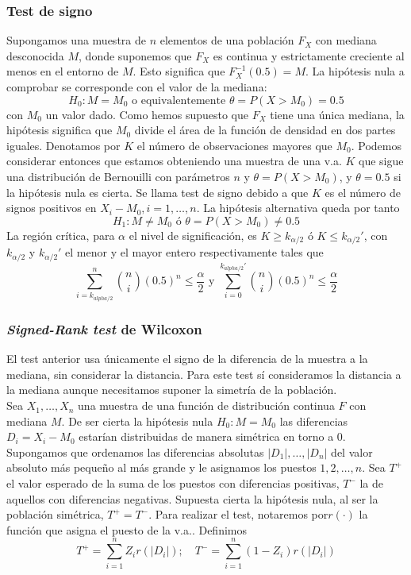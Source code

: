 \subsubsection{Test de signo}

	Supongamos una muestra de $n$ elementos de una población $F_X$ con mediana desconocida $M$, donde suponemos que $F_X$ es continua y estrictamente creciente al menos en el entorno de $M$. Esto significa que $F_X^{-1}(0.5) = M$. La hipótesis nula a comprobar se corresponde con el valor de la mediana:
	\[ H_0: M = M_0	\text{ o equivalentemente }
			\theta = P(X > M_0) = 0.5 \]
	con $M_0$ un valor dado. Como hemos supuesto que $F_X$ tiene una única mediana, la hipótesis significa que $M_0$ divide el área de la función de densidad en dos partes iguales. Denotamos por $K$ el número de observaciones mayores que $M_0$. Podemos considerar entonces que estamos obteniendo una muestra de una v.a. $K$ que sigue una distribución de Bernouilli con parámetros $n$ y $\theta=P(X>M_0)$, y $\theta=0.5$ si la hipótesis nula es cierta. Se llama test de signo debido a que $K$ es el número de signos positivos en $X_i - M_0, i = 1, \dots, n$. La hipótesis alternativa queda por tanto
	\[ H_1: M \neq M_0	\text{ ó }
			\theta = P(X > M_0) \neq 0.5 \]
	La región crítica, para $\alpha$ el nivel de significación, es $K \geq k_{\alpha/2}$ ó $K \leq k_{\alpha/2}'$, con $k_{\alpha/2}$ y $k_{\alpha/2}'$ el menor y el mayor entero respectivamente tales que
	\[ \sum\limits_{i=k_{alpha/2}}^n
			{n \choose i}(0.5)^n \leq \frac{\alpha}{2}
		\text{ y }
		\sum\limits_{i=0}^{k_{alpha/2}'}
			{n \choose i}(0.5)^n \leq \frac{\alpha}{2}
	\]

\subsubsection{\textit{Signed-Rank test} de Wilcoxon}

	El test anterior usa únicamente el signo de la diferencia de la muestra a la mediana, sin considerar la distancia. Para este test sí consideramos la distancia a la mediana aunque necesitamos suponer la simetría de la población. \\
	Sea $X_1, \dots, X_n$ una muestra de una función de distribución continua $F$ con mediana $M$. De ser cierta la hipótesis nula $H_0: M = M_0$ las diferencias $D_i = X_i - M_0$ estarían distribuidas de manera simétrica en torno a 0.\\
	Supongamos que ordenamos las diferencias absolutas $|D_1|, \dots, |D_n|$ del valor absoluto más pequeño al más grande y le asignamos los puestos $1, 2, \dots, n$. Sea $T^+$ el valor esperado de la suma de los puestos con diferencias positivas, $T^-$ la de aquellos con diferencias negativas. Supuesta cierta la hipótesis nula, al ser la población simétrica, $T^+ = T^-$. Para realizar el test, notaremos por$r(\cdot)$ la función que asigna el puesto de la v.a.. Definimos
	\[ T^+ = \sum\limits_{i=1}^n Z_i r(|D_i|); \quad
	   T^- = \sum\limits_{i=1}^n (1-Z_i) r(|D_i|) \]
	   
